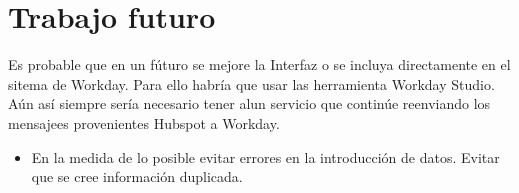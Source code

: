 \chapter{Trabajo futuro}


Es probable que en un fúturo se mejore la Interfaz o se incluya directamente en el sitema de Workday.
Para ello habría que usar las herramienta Workday Studio.
Aún así siempre sería necesario tener alun servicio que continúe reenviando los mensajees provenientes Hubspot a Workday. \\

\begin{itemize}
	\item En la medida de lo posible evitar errores en la introducción de datos. Evitar que se cree información duplicada.

\end{itemize}



